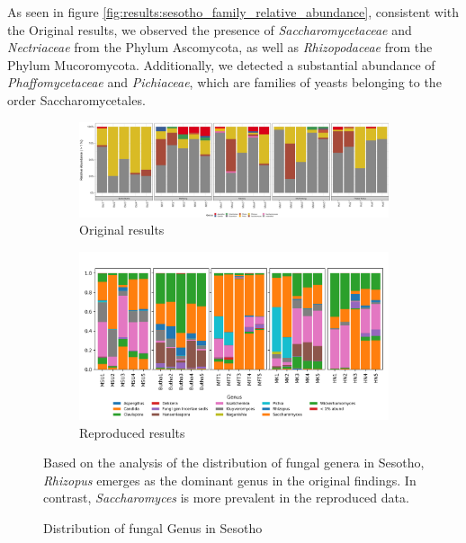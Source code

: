     As seen in figure \ref{fig:results:sesotho_family_relative_abundance}, consistent with the Original results, we observed the presence of \textit{Saccharomycetaceae} and \textit{Nectriaceae} from the Phylum Ascomycota, as well as \textit{Rhizopodaceae} from the Phylum Mucoromycota. Additionally, we detected a substantial abundance of \textit{Phaffomycetaceae} and \textit{Pichiaceae}, which are families of yeasts belonging to the order Saccharomycetales.

    \begin{figure}[H]
        \centering
        \begin{subfigure}[b]{1\textwidth}
            \centering
            \includegraphics[width=\textwidth]{images/sesotho/original_sesotho_genera_relative_abundance.png}
            \caption{Original results}
        \end{subfigure}
        \hfill
        \begin{subfigure}[b]{1\textwidth}
            \centering
            \includegraphics[width=\textwidth]{images/sesotho/sesotho_genus_relative_abundance.png}
            \caption{Reproduced results}
        \end{subfigure}
        \caption{Distribution of fungal Genus in Sesotho}
        \small Based on the analysis of the distribution of fungal genera in Sesotho, \textit{Rhizopus} emerges as the dominant genus in the original findings. In contrast, \textit{Saccharomyces} is more prevalent in the reproduced data.
        \label{fig:results:sesotho_genus_relative_abundance}
    \end{figure}
    
